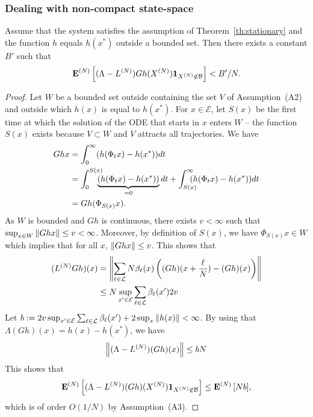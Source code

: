 \documentclass[sigconf]{acmart}
\newcommand\XN{X^{(N)}}
\newcommand\LN{L^{(N)}}
\newcommand\E{\mathcal{E}}
\newcommand\calL{\mathcal{L}}
\newcommand\calB{\mathcal{B}}
\newcommand\espN[1]{{\mathchoice{\bespN{#1}}{\sespN{#1}}{\sespN{#1}}{\sespN{#1}}}}
\newcommand\bespN[1]{\mathbf{E}^{(N)}\left[#1\right]}
\newcommand\sespN[1]{\mathbf{E}^{(N)}[#1]}
\newcommand\norm[1]{{\mathchoice{\bnorm{#1}}{\snorm{#1}}{\snorm{#1}}{\snorm{#1}}}}
\newcommand\bnorm[1]{\left\|#1\right\|}
\newcommand\snorm[1]{\|#1\|}
\newcommand\p[1]{\left(#1\right)}
\begin{document}
\subsubsection{Dealing with non-compact state-space}

\begin{lemma}\label{lem:proof_ss2} Assume that the system satisfies the
  assumption of Theorem~\ref{th:stationary} and the function $h$
  equals $h(x^*)$ outside a bounded set. Then there exists a constant
  $B'$ such that
  \begin{align*}
    \espN{(\Lambda-\LN)Gh(\XN)\mathbf{1}_{\XN\not\in\calB}}<B'/N.
  \end{align*}
\end{lemma}

\begin{proof}
  Let $W$ be a bounded set outside containing the set $V$ of
  Assumption~(A2) and outside which $h(x)$ is equal to $h(x^*)$. For
  $x\in\E$, let $S(x)$ be the first time at which the solution of the
  ODE that starts in $x$ enters $W$ -- the function $S(x)$ exists
  because $V\subset W$ and $V$ attracts all trajectories. We have
  \begin{align*}
    Gh x &= \int_0^\infty (h(\Phi_t x) - h(x^*)) dt\\
         &=\int_0^{S(x)}\hspace{-.3cm}\underbrace{(h(\Phi_t
           x) - h(x^*))}_{=0}dt + 
           \int_{S(x)}^{\infty}\hspace{-.3cm}(h(\Phi_t x) - h(x^*))dt\\
         &=Gh(\Phi_{S(x)}x).
  \end{align*}
  As $W$ is bounded and $Gh$ is continuous, there exists $v<\infty$
  such that $\sup_{x\in W}\norm{Ghx}\le v<\infty$. Moreover, by
  definition of $S(x)$, we have $\Phi_{S(x)}x\in W$ which implies that
  for all $x$, $\norm{Ghx}\le v$.  This shows that
  \begin{align*}
    (\LN Gh)(x) &= \norm{\sum_{\ell\in\calL}
                  N\beta_\ell(x)\p{(Gh)(x+\frac{\ell}{N})-(Gh)(x)}}\\
                &\le N \sup_{x'\in\E}\sum_{\ell\in\calL}\beta_\ell(x')
                  2v
  \end{align*}
  Let
  $b:=2v\sup_{x'\in\E}\sum_{\ell\in\calL}\beta_\ell(x')+2\sup_{x}\norm{h(x)}<\infty$. By
  using that $\Lambda(Gh)(x)=h(x)-h(x^*)$, we have
  \begin{align*}
    \norm{(\Lambda- \LN)(Gh)(x)} \le bN
  \end{align*}
  This shows that 
  \begin{align*}
    \espN{ (\Lambda-\LN)(Gh)(\XN)\mathbf{1}_{\XN\not\in\calB}}
    \le \espN{Nb},
  \end{align*}
  which is of order $O(1/N)$ by Assumption~(A3).
\end{proof}
\end{document}
